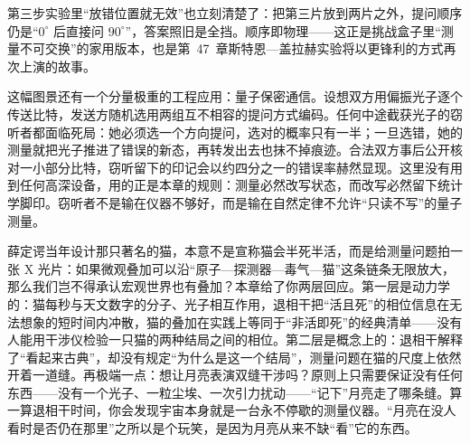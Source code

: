 第三步实验里“放错位置就无效”也立刻清楚了：把第三片放到两片之外，提问顺序仍是“$0^\circ$ 后直接问 $90^\circ$”，答案照旧是全挡。顺序即物理——这正是挑战盒子里“测量不可交换”的家用版本，也是第~47~章斯特恩—盖拉赫实验将以更锋利的方式再次上演的故事。

这幅图景还有一个分量极重的工程应用：量子保密通信。设想双方用偏振光子逐个传送比特，发送方随机选用两组互不相容的提问方式编码。任何中途截获光子的窃听者都面临死局：她必须选一个方向提问，选对的概率只有一半；一旦选错，她的测量就把光子推进了错误的新态，再转发出去也抹不掉痕迹。合法双方事后公开核对一小部分比特，窃听留下的印记会以约四分之一的错误率赫然显现。这里没有用到任何高深设备，用的正是本章的规则：测量必然改写状态，而改写必然留下统计学脚印。窃听者不是输在仪器不够好，而是输在自然定律不允许“只读不写”的量子测量。


\begin{thought}
薛定谔当年设计那只著名的猫，本意不是宣称猫会半死半活，而是给测量问题拍一张 X 光片：如果微观叠加可以沿“原子—探测器—毒气—猫”这条链条无限放大，那么我们岂不得承认宏观世界也有叠加？本章给了你两层回应。第一层是动力学的：猫每秒与天文数字的分子、光子相互作用，退相干把“活且死”的相位信息在无法想象的短时间内冲散，猫的叠加在实践上等同于“非活即死”的经典清单——没有人能用干涉仪检验一只猫的两种结局之间的相位。第二层是概念上的：退相干解释了“看起来古典”，却没有规定“为什么是这一个结局”，测量问题在猫的尺度上依然开着一道缝。再极端一点：想让月亮表演双缝干涉吗？原则上只需要保证没有任何东西——没有一个光子、一粒尘埃、一次引力扰动——“记下”月亮走了哪条缝。算一算退相干时间，你会发现宇宙本身就是一台永不停歇的测量仪器。“月亮在没人看时是否仍在那里”之所以是个玩笑，是因为月亮从来不缺“看”它的东西。
\end{thought}

